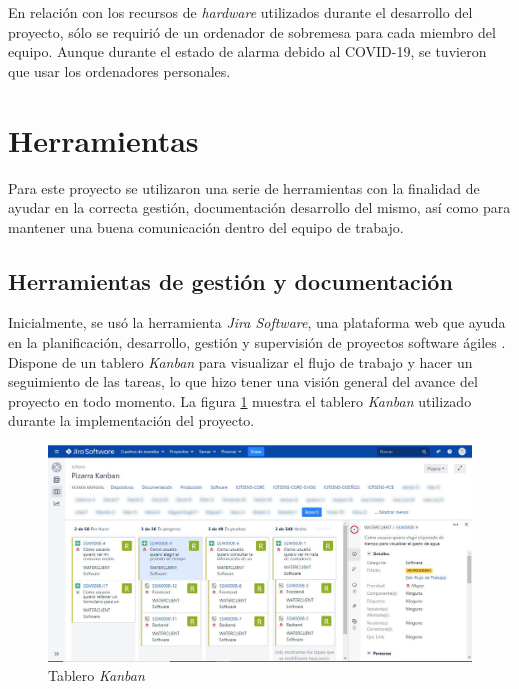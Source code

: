 \documentclass[pdftex,11pt,a4paper]{book}
\begin{document}
En relación con los recursos de \textit{hardware} utilizados durante el desarrollo del proyecto, sólo se requirió de un ordenador de sobremesa para cada miembro del equipo. Aunque durante el estado de alarma debido al COVID-19, se tuvieron que usar los ordenadores personales.

\section{Herramientas}

Para este proyecto se utilizaron una serie de herramientas con la finalidad de ayudar en la correcta gestión, documentación desarrollo del mismo, así como para mantener una buena comunicación dentro del equipo de trabajo.

\subsection{Herramientas de gestión y documentación} 

Inicialmente, se usó la herramienta \textit{Jira Software}, una plataforma web que ayuda en la planificación, desarrollo, gestión y supervisión de proyectos software ágiles \cite{bib:atlassian}. Dispone de un tablero \textit{Kanban} para visualizar el flujo de trabajo y hacer un seguimiento de las tareas, lo que hizo tener una visión general del avance del proyecto en todo momento. La figura \ref{fig:tablero-kanban} muestra el tablero \textit{Kanban} utilizado durante la implementación del proyecto.

\begin{figure}[H]
 \centering
 \includegraphics [scale=0.42] {images/planificacion/kanban.png}
 \caption{Tablero \textit{Kanban}} \label{fig:tablero-kanban}
 \end{figure}
\end{document}
